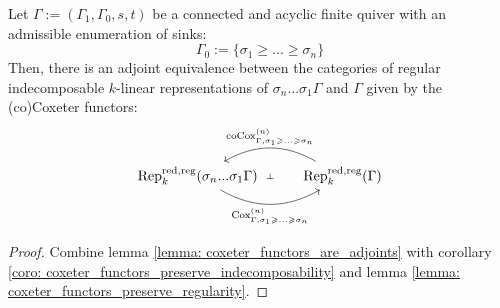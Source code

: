             \begin{theorem} \label{theorem: coxeter_functors_fix_regular_indecomposable_representations}
                Let $\Gamma := (\Gamma_1, \Gamma_0, s, t)$ be a connected and acyclic finite quiver with an admissible enumeration of sinks:
                    $$\Gamma_0 := \{\sigma_1 \geq ... \geq \sigma_n\}$$
                Then, there is an adjoint equivalence between the categories of regular indecomposable $k$-linear representations of $\sigma_n ... \sigma_1 \Gamma$ and $\Gamma$ given by the (co)Coxeter functors:
                    $$
                        \begin{tikzcd}
                        	{\Rep_k^{\red, \reg}(\sigma_n ... \sigma_1\Gamma)} & {\Rep_k^{\red, \reg}(\Gamma)}
                        	\arrow[""{name=0, anchor=center, inner sep=0}, "{\Cox_{\Gamma, \sigma_1 \geq ...\geq \sigma_n}^{(n)}}"', bend right, from=1-1, to=1-2]
                        	\arrow[""{name=1, anchor=center, inner sep=0}, "{\co\Cox_{\Gamma, \sigma_1 \geq ...\geq \sigma_n}^{(n)}}"', bend right, from=1-2, to=1-1]
                        	\arrow["\dashv"{anchor=center, rotate=-90}, draw=none, from=1, to=0]
                        \end{tikzcd}
                    $$
            \end{theorem}
                \begin{proof}
                    Combine lemma \ref{lemma: coxeter_functors_are_adjoints} with corollary \ref{coro: coxeter_functors_preserve_indecomposability} and lemma \ref{lemma: coxeter_functors_preserve_regularity}.
                \end{proof}
            
